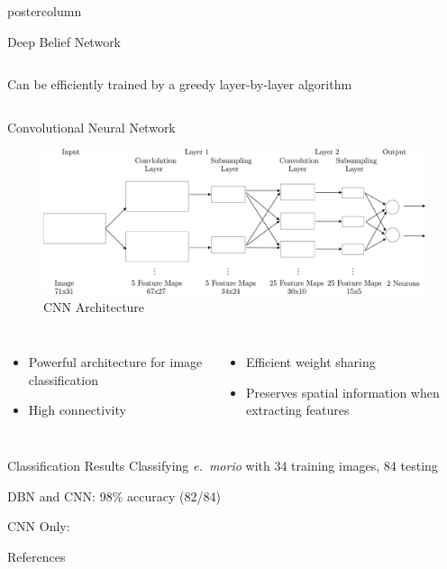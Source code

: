 \documentclass[final]{beamer}
\begin{document}
\begin{frame}
\begin{columns}
\begin{column}{.33\textwidth}
\begin{beamercolorbox}[center,wd=\textwidth]{postercolumn}
\begin{minipage}[T]{.95\textwidth}
{\begin{block}{Deep Belief Network}
\begin{columns}
\begin{itemize}
                      Can be efficiently trained by a greedy layer-by-layer
                      algorithm
                      \end{itemize}              
                \end{columns}
            \end{block}
            \vfill
            \begin{block}{Convolutional Neural Network}
            \begin{figure}[htbp]
               \centering
               \includegraphics[height=4\baselineskip]{cnnarch} %
               \caption{CNN Architecture}
            \end{figure}
            \begin{columns}
                \begin{itemize}
                \item Powerful architecture for image classification
                \item High connectivity
                \end{itemize}
                \begin{itemize}
                \item Efficient weight sharing
                \item Preserves spatial information when extracting features
                \end{itemize}
            \end{columns}
            \end{block}
            \vfill
            \begin{block}{Classification Results}
             Classifying {\it e.~morio} with 
             34 training images, 84 testing

             DBN and CNN: 98\% accuracy (82/84)

             CNN Only: 
            \end{block}
            \vfill
            \begin{block}{References}
              \nocite{Xiao:2008vn}
              \nocite{Tao:2008bh}
	    \nocite{Kittler:1986zr}
	    \nocite{Ila05}
             \def\newblock{}\small
	    
  	    
	    

\end{block}}
\end{minipage}
\end{beamercolorbox}
\end{column}
\end{columns}
\end{frame}
\end{document}
